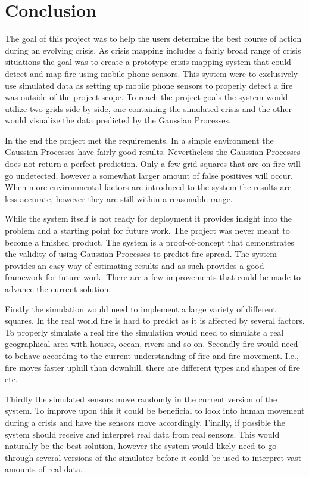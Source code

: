 \chapter{Conclusion}

The goal of this project was to help the users determine the best course of action during an evolving crisis. As crisis mapping includes a fairly broad range of crisis situations the goal was to create a prototype crisis mapping system that could detect and map fire using mobile phone sensors. This system were to exclusively use simulated data as setting up mobile phone sensors to properly detect a fire was outside of the project scope. To reach the project goals the system would utilize two grids side by side, one containing the simulated crisis and the other would visualize the data predicted by the Gaussian Processes.

In the end the project met the requirements. In a simple environment the Gaussian Processes have fairly good results. Nevertheless the Gaussian Processes does not return a perfect prediction. Only a few grid squares that are on fire will go undetected, however a somewhat larger amount of false positives will occur. When more environmental factors are introduced to the system the results are less accurate, however they are still within a reasonable range.

While the system itself is not ready for deployment it provides insight into the problem and a starting point for future work. The project was never meant to become a finished product. The system is a  proof-of-concept that demonstrates the validity of using Gaussian Processes to predict fire spread. The system provides an easy way of estimating results and as such provides a good framework for future work. There are a few improvements that could be made to advance the current solution.

Firstly the simulation would need to implement a large variety of different squares. In the real world fire is hard to predict as it is affected by several factors. To properly simulate a real fire the simulation would need to simulate a real geographical area with houses, ocean, rivers and so on. Secondly fire would need to behave according to the current understanding of fire and fire movement. I.e., fire moves faster uphill than downhill, there are different types and shapes of fire etc.

Thirdly the simulated sensors move randomly in the current version of the system. To improve upon this it could be beneficial to look into human movement during a crisis and have the sensors move accordingly. Finally, if possible the system should receive and interpret real data from real sensors. This would naturally be the best solution, however the system would likely need to go through several versions of the simulator before it could be used to interpret vast amounts of real data.